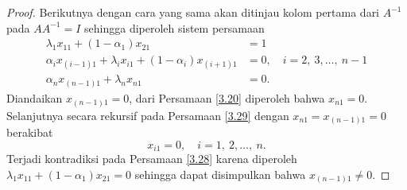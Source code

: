 \begin{proof}
    Berikutnya dengan cara yang sama akan ditinjau kolom pertama dari $A^{-1}$ pada $AA^{-1}=I$ sehingga diperoleh sistem persamaan
    \begin{align}
        \lambda_1x_{11} + (1 - \alpha_1)x_{21} &= 1 \label{3.28}\\
        \alpha_ix_{(i-1)1} + \lambda_ix_{i1} + (1 - \alpha_i)x_{(i+1)1} &= 0, \quad i=2,~3,\dots,~n-1 \label{3.29}\\
        \alpha_nx_{(n-1)1} + \lambda_nx_{n1} &= 0.\label{3.30}
    \end{align}
    Diandaikan $x_{(n-1)1}=0$, dari Persamaan \eqref{3.20} diperoleh bahwa $x_{n1}=0$. Selanjutnya secara rekursif pada Persamaan \eqref{3.29} dengan $x_{n1}=x_{(n-1)1}=0$ berakibat
    \begin{equation*}
        x_{i1}=0, \quad i=1,~2,\dots,~n.
    \end{equation*}
    Terjadi kontradiksi pada Persamaan \eqref{3.28} karena diperoleh $\lambda_1x_{11} + (1 - \alpha_1)x_{21} = 0$ sehingga dapat disimpulkan bahwa $x_{(n-1)1} \neq 0$.


\end{proof}
